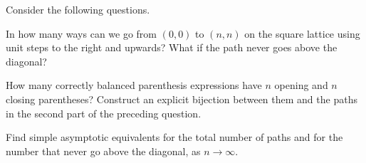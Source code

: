 \begin{problemstar}
Consider the following questions.
\begin{enumeratea}
  \item In how many ways can we go from $(0,0)$ to $(n,n)$ on the square lattice
  using unit steps to the right and upwards? What if the path never goes above the diagonal?
  \item How many correctly balanced parenthesis expressions have $n$ opening and $n$
  closing parentheses? Construct an explicit bijection between them and the paths
  in the second part of the preceding question.
  \item Find simple asymptotic equivalents for the total number of paths and for the
  number that never go above the diagonal, as $n\to\infty$.
\end{enumeratea}
\end{problemstar}
